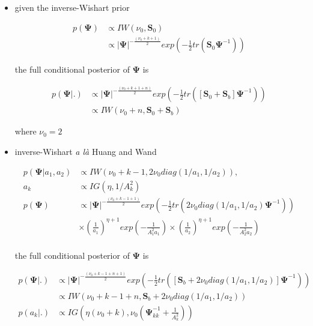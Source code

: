 \documentclass[a4paper]{article}
\begin{document}
\begin{itemize}
	\item given the inverse-Wishart prior

\begin{equation*}
 \begin{split} 
  p(\bm{\Psi})& \propto IW(\nu_0, \bm{S}_{0}) \\
  & \propto |\bm{\Psi}|^{-\frac{(\nu_0 + k + 1)}{2}}exp\left(-\frac{1}{2}tr(\bm{S}_0\bm{\Psi}^{-1}) \right)
 \end{split}
\end{equation*}

the full conditional posterior of $\bm{\Psi}$ is

\begin{equation}
 \begin{split} 
  p(\bm{\Psi}|.)& \propto |\bm{\Psi}|^{-\frac{(\nu_0 + k + 1 + n)}{2}}exp\left(-\frac{1}{2}tr([\bm{S}_0+\bm{S}_b]\bm{\Psi}^{-1}) \right) \\
  & \propto IW(\nu_0 + n, \bm{S}_{0} + \bm{S}_{b})
 \end{split}
\end{equation}	

where $\nu_0 = 2$

	\item inverse-Wishart \textit{a là} Huang and Wand
	
\begin{equation*}
	\begin{split}
	p(\bm{\Psi}|a_1, a_2)& \propto IW(\nu_0 + k - 1, 2\nu_0 diag(1/a_1, 1/a_2)), \\
	a_k& \propto IG(\eta,1/A_k^2) \\
	p(\bm{\Psi})& \propto |\bm{\Psi}|^{-\frac{(\nu_0+k-1+1)}{2}}exp\left(-\frac{1}{2}tr(2\nu_0 diag(1/a_1, 1/a_2)\bm{\Psi}^{-1}) \right) \\
	& \times \left(\frac{1}{a_1}\right)^{\eta+1}exp\left(-\frac{1}{A_1^2a_1}\right) \times \left(\frac{1}{a_2}\right)^{\eta+1}exp\left(-\frac{1}{A_2^2a_2}\right) \\
	\end{split}
\end{equation*}

the full conditional posterior of $\bm{\Psi}$ is

\begin{equation}
 \begin{split} 
  p(\bm{\Psi}|.)& \propto |\bm{\Psi}|^{-\frac{(\nu_0+k-1+n+1)}{2}}exp\left(-\frac{1}{2}tr([\bm{S}_b+2\nu_0 diag(1/a_1, 1/a_2)]\bm{\Psi}^{-1}) \right) \\
  & \propto IW(\nu_0+k-1+n, \bm{S}_{b}+2\nu_0 diag(1/a_1, 1/a_2))\\
  p(a_k|.)& \propto IG\left(\eta(\nu_0+k), \nu_0\left(\bm{\Psi}^{-1}_{kk}+\frac{1}{A_k^2}\right)\right)
 \end{split}
\end{equation}		


\end{itemize}
\end{document}
